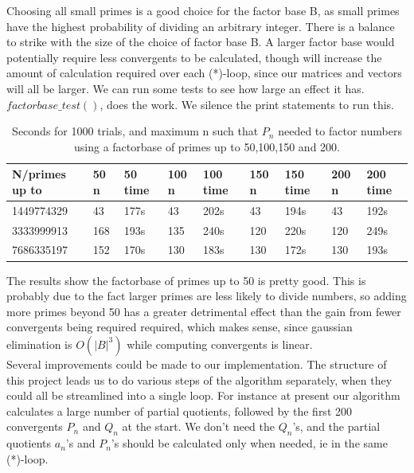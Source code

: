 \documentclass[10pt,a4paper]{report}
\begin{document}
Choosing all small primes is a good choice for the factor base B, as small primes have the highest probability of dividing an arbitrary integer. There is a balance to strike with the size of the choice of factor base B. A larger factor base would potentially require less convergents to be calculated, though will increase the amount of calculation required over each (*)-loop, since our matrices and vectors will all be larger. We can run some tests to see how large an effect it has. $factorbase\_test()$, does the work. We silence the print statements to run this.\\

\begin{table}[h]
\centering
\begin{tabular}{|l|l|l|l|l|l|l|l|l|}
\hline
N/primes up to & 50 n & 50 time & 100 n & 100 time & 150 n & 150 time & 200 n & 200 time \\ \hline
1449774329     & 43   & 177s    & 43    & 202s     & 43    & 194s     & 43    & 192s     \\ \hline
3333999913     & 168  & 193s    & 135   & 240s     & 120   & 220s     & 120   & 249s     \\ \hline
7686335197     & 152  & 170s    & 130   & 183s     & 130   & 172s     & 130   & 193s     \\ \hline
\end{tabular}
\caption{Seconds for 1000 trials, and maximum n such that $P_n$ needed to factor numbers using a factorbase of primes up to 50,100,150 and 200.}
\end{table}


The results show the factorbase of primes up to 50 is pretty good. This is probably due to the fact larger primes are less likely to divide numbers, so adding more primes beyond 50 has a greater detrimental effect than the gain from fewer convergents being required required, which makes sense, since gaussian elimination is $O(|B|^3)$ while computing convergents is linear. \\

Several improvements could be made to our implementation. The structure of this project leads us to do various steps of the algorithm separately, when they could all be streamlined into a single loop. For instance at present our algorithm calculates a large number of partial quotients, followed by the first 200 convergents $P_n$ and $Q_n$ at the start. We don't need the $Q_n$'s, and the partial quotients $a_n$'s and $P_n$'s should be calculated only when needed, ie in the same (*)-loop. \\
\end{document}
